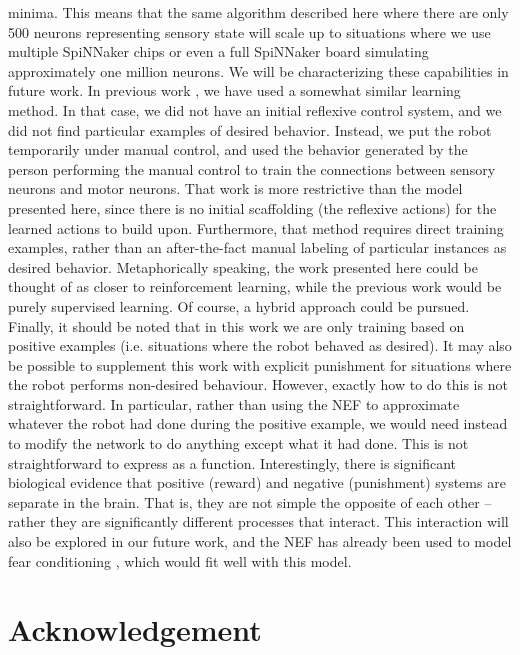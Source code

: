 \documentclass[conference]{IEEEtran}
\begin{document}
minima. This means that the same algorithm described here
where there are only 500 neurons representing sensory state
will scale up to situations where we use multiple SpiNNaker
chips or even a full SpiNNaker board simulating
approximately one million neurons. We will be
characterizing these capabilities in future work.
In previous work \cite{conradt2014trainable}, we have used a somewhat similar
learning method. In that case, we did not have an initial
reflexive control system, and we did not find particular
examples of desired behavior. Instead, we put the robot
temporarily under manual control, and used the behavior
generated by the person performing the manual control to
train the connections between sensory neurons and motor
neurons. That work is more restrictive than the model
presented here, since there is no initial scaffolding (the
reflexive actions) for the learned actions to build upon.
Furthermore, that method requires direct training examples,
rather than an after-the-fact manual labeling of particular
instances as desired behavior. Metaphorically speaking, the
work presented here could be thought of as closer to
reinforcement learning, while the previous work would be
purely supervised learning. Of course, a hybrid approach
could be pursued.
Finally, it should be noted that in this work we are only
training based on positive examples (i.e. situations where
the robot behaved as desired). It may also be possible to
supplement this work with explicit punishment for situations where the robot performs non-desired behaviour.
However, exactly how to do this is not straightforward. In
particular, rather than using the NEF to approximate
whatever the robot had done during the positive example,
we would need instead to modify the network to do
anything except what it had done. This is not
straightforward to express as a function. Interestingly, there
is significant biological evidence that positive (reward) and
negative (punishment) systems are separate in the brain.
That is, they are not simple the opposite of each other –
rather they are significantly different processes that interact.
This interaction will also be explored in our future work,
and the NEF has already been used to model fear
conditioning \cite{kolbeck2013fear}, which would fit well with this model.



\section*{Acknowledgement}
\end{document}
